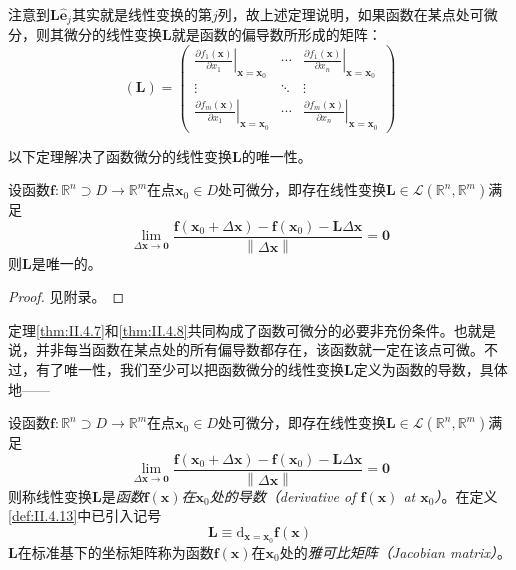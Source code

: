 \documentclass[main.tex]{subfiles}
\begin{document}
注意到$\mathbf{L\hat{e}}_j$其实就是线性变换的第$j$列，故上述定理说明，如果函数在某点处可微分，则其微分的线性变换$\mathbf{L}$就是函数的偏导数所形成的矩阵：
\[
    \left(\mathbf{L}\right)=\left(\begin{array}{ccc}
            \left.\frac{\partial f_1\left(\mathbf{x}\right)}{\partial x_1}\right|_{\mathbf{x}=\mathbf{x}_0} & \cdots & \left.\frac{\partial f_1\left(\mathbf{x}\right)}{\partial x_n}\right|_{\mathbf{x}=\mathbf{x}_0} \\
            \vdots                                                                                          & \ddots & \vdots                                                                                          \\
            \left.\frac{\partial f_m\left(\mathbf{x}\right)}{\partial x_1}\right|_{\mathbf{x}=\mathbf{x}_0} & \cdots & \left.\frac{\partial f_m\left(\mathbf{x}\right)}{\partial x_n}\right|_{\mathbf{x}=\mathbf{x}_0}
        \end{array}\right)
\]

以下定理解决了函数微分的线性变换$\mathbf{L}$的唯一性。

\begin{theorem}\label{thm:II.4.8}
    设函数$\mathbf{f}:\mathbb{R}^n\supset D\rightarrow\mathbb{R}^m$在点$\mathbf{x}_0\in D$处可微分，即存在线性变换$\mathbf{L}\in\mathcal{L}\left(\mathbb{R}^n,\mathbb{R}^m\right)$满足
    \[
        \lim_{\Delta\mathbf{x}\to\mathbf{0}}\frac{\mathbf{f}\left(\mathbf{x}_0+\Delta \mathbf{x}\right)-\mathbf{f}\left(\mathbf{x}_0\right)-\mathbf{L}\Delta\mathbf{x}}{\left\|\Delta\mathbf{x}\right\|}=\mathbf{0}
    \]
    则$\mathbf{L}$是唯一的。
\end{theorem}
\begin{proof}
    见附录。
\end{proof}

定理\ref{thm:II.4.7}和\ref{thm:II.4.8}共同构成了函数可微分的必要非充份条件。也就是说，并非每当函数在某点处的所有偏导数都存在，该函数就一定在该点可微\cite[“例2”,p.~21]{华工高数2009下}。不过，有了唯一性，我们至少可以把函数微分的线性变换$\mathbf{L}$定义为函数的导数，具体地——

\begin{definition}[向量函数的导数]\label{def:II.4.14}
    设函数$\mathbf{f}:\mathbb{R}^n\supset D\rightarrow\mathbb{R}^m$在点$\mathbf{x}_0\in D$处可微分，即存在线性变换$\mathbf{L}\in\mathcal{L}\left(\mathbb{R}^n,\mathbb{R}^m\right)$满足
    \[
        \lim_{\Delta\mathbf{x}\to\mathbf{0}}\frac{\mathbf{f}\left(\mathbf{x}_0+\Delta \mathbf{x}\right)-\mathbf{f}\left(\mathbf{x}_0\right)-\mathbf{L}\Delta\mathbf{x}}{\left\|\Delta\mathbf{x}\right\|}=\mathbf{0}
    \]
    则称线性变换$\mathbf{L}$是\emph{函数$\mathbf{f}\left(\mathbf{x}\right)$在$\mathbf{x}_0$处的导数（derivative of $\mathbf{f}\left(\mathbf{x}\right)$ at $\mathbf{x}_0$）}。在定义\ref{def:II.4.13}中已引入记号
    \[\mathbf{L}\equiv \mathrm{d}_{\mathbf{x}=\mathbf{x}_0}\mathbf{f}\left(\mathbf{x}\right)\]
    $\mathbf{L}$在标准基下的坐标矩阵称为函数$\mathbf{f}\left(\mathbf{x}\right)$在$\mathbf{x}_0$处的\emph{雅可比矩阵（Jacobian matrix）}。
\end{definition}
\end{document}
